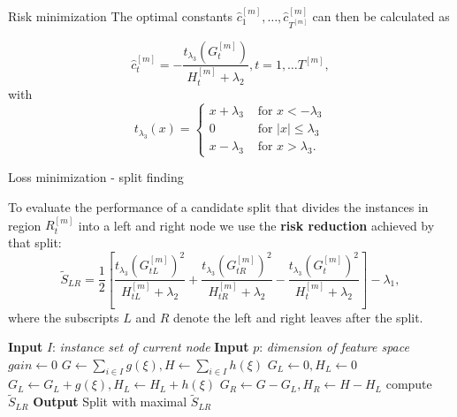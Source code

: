 \documentclass[11pt,compress,t,notes=noshow, xcolor=table]{beamer}
\begin{document}
\begin{vbframe}{Risk minimization}
    The optimal constants $\hat{c}^{[m]}_1,\dots, \hat{c}^{[m]}_{T^{[m]}}$ can then be calculated as

    \lz
    $$
    \hat{c}^{[m]}_t = - \frac{t_{\lambda_3}\left(G^{[m]}_t\right)}{H^{[m]}_t + \lambda_2}, t=1,\dots T^{[m]},
    $$
    with $$t_{\lambda_3}(x) = \begin{cases}
      x + \lambda_3 &\text{ for } x < - \lambda_3 \\
      0  &\text{ for } |x| \leq \lambda_3 \\
      x - \lambda_3 &\text{ for } x > \lambda_3.
    \end{cases}$$

    \end{vbframe}



\begin{vbframe}{Loss minimization - split finding}

    To evaluate the performance of a candidate split that divides the instances in region $R_t^{[m]}$ into a left and right node we use the \textbf{risk reduction} achieved by that split:
    $$
    \tilde S_{LR} =
     \frac12 \left[
     \frac{t_{\lambda_3} \left( G^{[m]}_{tL} \right)^2}{H^{[m]}_{tL} + \lambda_2} + \frac{t_{\lambda_3}\left(G^{[m]}_{tR}\right)^2}{H^{[m]}_{tR} + \lambda_2} - \frac{t_{\lambda_3}\left(G^{[m]}_{t}\right)^2}{H^{[m]}_{t} + \lambda_2}
     \right] - \lambda_1,
    $$
    where the subscripts $L$ and $R$ denote the left and right leaves after the split.


    \lz

    \framebreak

    \begin{algorithm}[H]

    \begin{footnotesize}
    \begin{center}

      \begin{algorithmic}[1]
        \State \textbf{Input} $I$: \emph{instance set of current node}
        \State \textbf{Input} $p$: \emph{dimension of feature space}
        \State $gain \gets 0$
        \State $G \gets \sum_{i \in I} g(\xi), {H} \gets \sum_{i \in I} h(\xi)$
          \State $G_L \gets 0, {H}_L \gets 0$
            \State ${G}_L \gets {G}_L + g(\xi), {H}_L \gets {H}_L + h(\xi)$
            \State ${G}_R \gets G - {G}_L, {H}_R \gets {H} - {H}_L$
            \State compute $\tilde S_{LR}$
          \EndFor
        \EndFor
        \State \textbf{Output} Split with maximal $\tilde S_{LR}$
      \end{algorithmic}
    \end{center}
    \end{footnotesize}
    \caption{(Exact) Algorithm for split finding}
    \end{algorithm}

    \end{vbframe}

    \endlecture
\end{document}
